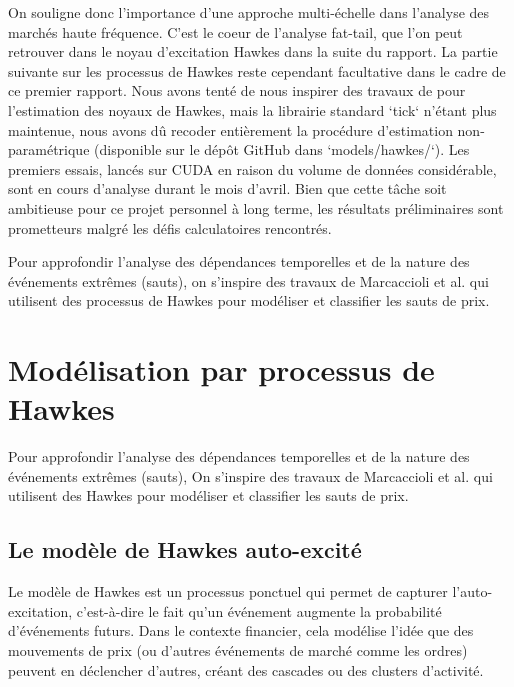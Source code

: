 \documentclass[10pt,a4paper]{article}
\theoremstyle{definition}
\theoremstyle{remark}
\begin{document}
\begin{itemize}
    
On souligne donc l'importance d'une approche multi-échelle dans l'analyse des marchés haute fréquence. C'est le coeur de l'analyse fat-tail, que l'on peut retrouver dans le noyau d'excitation Hawkes dans la suite du rapport. La partie suivante sur les processus de Hawkes reste cependant facultative dans le cadre de ce premier rapport. Nous avons tenté de nous inspirer des travaux de \cite{bacry2014estimationslowlydecreasinghawkes} pour l'estimation des noyaux de Hawkes, mais la librairie standard `tick` n'étant plus maintenue, nous avons dû recoder entièrement la procédure d'estimation non-paramétrique (disponible sur le dépôt GitHub dans `models/hawkes/`). Les premiers essais, lancés sur CUDA en raison du volume de données considérable, sont en cours d'analyse durant le mois d'avril. Bien que cette tâche soit ambitieuse pour ce projet personnel à long terme, les résultats préliminaires sont prometteurs malgré les défis calculatoires rencontrés.


Pour approfondir l'analyse des dépendances temporelles et de la nature des événements extrêmes (sauts), on s'inspire des travaux de Marcaccioli et al. \cite{marcaccioli2021exogenous} qui utilisent des processus de Hawkes pour modéliser et classifier les sauts de prix.


\newpage
\section{Modélisation par processus de Hawkes}

    Pour approfondir l'analyse des dépendances temporelles et de la nature des événements extrêmes (sauts), On s'inspire des travaux de Marcaccioli et al. \cite{marcaccioli2021exogenous} qui utilisent des Hawkes pour modéliser et classifier les sauts de prix.

    \subsection{Le modèle de Hawkes auto-excité}

    Le modèle de Hawkes est un processus ponctuel qui permet de capturer l'auto-excitation, c'est-à-dire le fait qu'un événement augmente la probabilité d'événements futurs. Dans le contexte financier, cela modélise l'idée que des mouvements de prix (ou d'autres événements de marché comme les ordres) peuvent en déclencher d'autres, créant des cascades ou des clusters d'activité.


\end{itemize}
\end{document}
